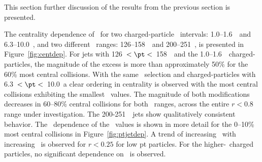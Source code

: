 
This section further discussion of the results from the previous section is presented.

The centrality dependence of \RDptr\ for two charged-particle \pt\ intervals: 1.0--1.6~\GeV\ and \mbox{6.3--10.0~\GeV}, and two different \ptjet\ ranges: 126--158~\GeV\ and 200--251~\GeV, is presented in Figure~\ref{fig:centdep}. 
For jets with 126~$<\pt < $~158~\GeV\ and  the 1.0--1.6~\GeV\ charged-particles, the magnitude of the excess is more than approximately 50\% for the
60\% most central collisions.  With the same \ptjet\ selection and 
charged-particles with 6.3~$ < \pt < $~10.0~\GeV a clear ordering in centrality is observed with
the most central collisions exhibiting the smallest \RDptr\ values.
The magnitude of both modifications decreases in 60--80\% central collisions for both \pt\ ranges, across the entire $ r < 0.8$ range under investigation.  The 200-251~\GeV\ jets show qualitatively consistent behavior.
The \ptjet\ dependence of the \RDptr\ values is shown in more detail for the 0--10\% most central collisions
in Figure~\ref{fig:ptjetdep}.  A trend of increasing \RDptr\ with increasing \ptjet\ is observed for $r < 0.25$ for low pt particles. 
For the higher-\pt\ charged particles, no significant dependence on \ptjet\ is observed. 

